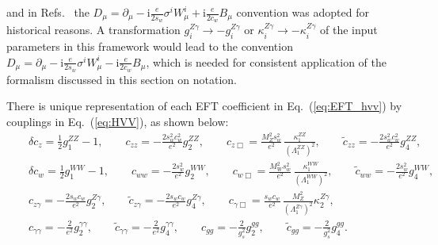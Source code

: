 \documentclass[aps,superscriptaddress,nofootinbib]{revtex4}
\begin{document}
and in Refs.~\cite{Gao:2010qx,Bolognesi:2012,Anderson:2013,Gritsan:2016hjl,Gritsan:2020pib,Martini:2021uey,Davis:2022} 
the $D_\mu = \partial_\mu -\mathrm{i} \frac{e}{2 s_w} \sigma^i W_\mu^i + \mathrm{i} \frac{e}{2 c_w} B_\mu$
convention was adopted for historical reasons. A transformation $g_i^{Z\gamma}\to -g_i^{Z\gamma}$ or $\kappa_i^{Z\gamma}\to -\kappa_i^{Z\gamma}$
of the input parameters in this framework would lead to the convention 
$D_\mu = \partial_\mu -\mathrm{i} \frac{e}{2 s_w} \sigma^i W_\mu^i - \mathrm{i} \frac{e}{2 c_w} B_\mu$,
which is needed for consistent application of the formalism discussed in this section on notation. 

There is unique representation of each EFT coefficient in Eq.~(\ref{eq:EFT_hvv}) by couplings in Eq.~(\ref{eq:HVV}),
as shown below:
\begin{eqnarray}  &&
\label{eq:EFT_ci}
    \delta c_z  = \frac12 g_1^{ZZ} - 1,
    \quad\quad
    c_{zz} = -\frac{2 s_w^2 c_w^2}{e^2} g_2^{ZZ},
    \quad\quad
    c_{z \Box} = \frac{M_Z^2 s_w^2}{e^2} \, \frac{\kappa_1^{ZZ}}{(\Lambda_1^{ZZ})^2},
    \quad\quad
    \tilde c_{zz} = -\frac{2 s_w^2 c_w^2}{e^2} g_4^{ZZ},
    \nonumber \\ &&
     \delta c_w = \frac12 g_1^{WW} - 1,
    \quad\quad
    c_{ww} = -\frac{2 s_w^2 }{e^2} g_2^{WW},
    \quad\quad
    c_{w \Box} = \frac{M_W^2 s_w^2}{e^2} \, \frac{\kappa_1^{WW}}{(\Lambda_1^{WW})^2},
    \quad\quad
    \tilde c_{ww} = -\frac{2 s_w^2}{e^2} g_4^{WW},
    \nonumber\\ &&
     c_{z \gamma} = -\frac{2 s_w c_w}{e^2} g_2^{Z\gamma},
    \quad\quad
    \tilde c_{z \gamma} = -\frac{2 s_w c_w}{e^2} g_4^{Z\gamma},
    \quad\quad
    c_{\gamma \Box} = \frac{s_w c_w}{e^2} \, \frac{M_Z^2}{(\Lambda_1^{Z\gamma})^2} \kappa_2^{Z\gamma},
   \nonumber\\ &&
     c_{\gamma \gamma} = -\frac{2}{e^2} g_2^{\gamma\gamma},   
    \quad\quad
   \tilde c_{\gamma \gamma} = -\frac{2}{e^2} g_4^{\gamma\gamma},
    \quad\quad
     c_{gg} = -\frac{2}{g_s^2} g_2^{gg},
   \quad\quad
   \tilde c_{gg} = -\frac{2}{g_s^2} g_4^{gg}.
\end{eqnarray} 
\end{document}
